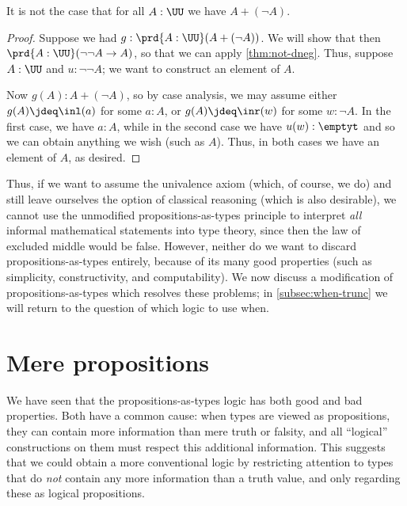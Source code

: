 \begin{cor}\label{thm:not-lem}
  It is not the case that for all $A:\UU$ we have $A+(\neg A)$.
\end{cor}
\begin{proof}
  Suppose we had $g:\prd{A:\UU} (A+(\neg A))$.
  We will show that then $\prd{A:\UU} (\neg\neg A \to A)$, so that we can apply \cref{thm:not-dneg}.
  Thus, suppose $A:\UU$ and $u:\neg\neg A$; we want to construct an element of $A$.

  Now $g(A):A+(\neg A)$, so by case analysis, we may assume either $g(A)\jdeq \inl(a)$ for some $a:A$, or $g(A)\jdeq \inr(w)$ for some $w:\neg A$.
  In the first case, we have $a:A$, while in the second case we have $u(w):\emptyt$ and so we can obtain anything we wish (such as $A$).
  Thus, in both cases we have an element of $A$, as desired.
\end{proof}

Thus, if we want to assume the univalence axiom (which, of course, we do) and still leave ourselves the option of classical reasoning (which is also desirable), we cannot use the unmodified propositions-as-types principle to interpret \emph{all} informal mathematical statements into type theory, since then the law of excluded middle would be false.
However, neither do we want to discard propositions-as-types entirely, because of its many good properties (such as simplicity, constructivity, and computability).
We now discuss a modification of propositions-as-types which resolves these problems; in \cref{subsec:when-trunc} we will return to the question of which logic to use when.
%
%
%

\section{Mere propositions}
\label{subsec:hprops}

%
%
%
We have seen that the propositions-as-types logic has both good and bad properties.
Both have a common cause: when types are viewed as propositions, they can contain more information than mere truth or falsity, and all ``logical'' constructions on them must respect this additional information.
This suggests that we could obtain a more conventional logic by restricting attention to types that do \emph{not} contain any more information than a truth value, and only regarding these as logical propositions.

